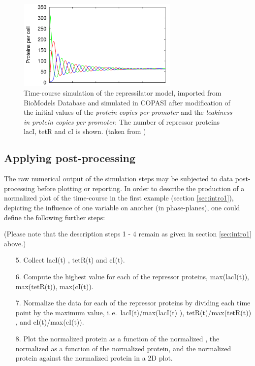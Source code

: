\begin{figure}
\centering
\includegraphics[width=0.7\textwidth]{examples/simEx3.png}
\caption{Time-course simulation of the repressilator model, imported from BioModels Database and simulated in COPASI after modification of the initial values of the \emph{protein copies per promoter} and the \emph{leakiness in protein copies per promoter}. The number of repressor proteins lacI, tetR and cI is shown. (taken from \cite{Waltemath:2011})}
\label{fig:simEx3}
\end{figure}

\subsection{Applying post-processing}
The raw numerical output of the simulation steps may be subjected to data post-processing before plotting or reporting.  In order to describe the production of a normalized plot of the time-course in the first example (section \ref{sec:intro1}), depicting the influence of one variable on another (in phase-planes), one could define the following further steps:

(Please note that the description steps 1 - 4 remain as given in section \ref{sec:intro1} above.)
\begin{enumerate}
\item[5.]{Collect lacI(t) , tetR(t) and cI(t).}
\item[6.]{Compute the highest value for each of the repressor proteins,  max(lacI(t)), max(tetR(t)), max(cI(t)).}
\item[7.]{Normalize the data for each of the repressor proteins by dividing each time point by the maximum value, i.\,e.\ lacI(t)/max(lacI(t) ), tetR(t)/max(tetR(t)) , and cI(t)/max(cI(t)).}
\item[8.]{Plot the normalized  protein as a function of the normalized , the normalized   as a function of the normalized  protein, and the normalized  protein against the normalized  protein in a 2D plot.}
\end{enumerate}

